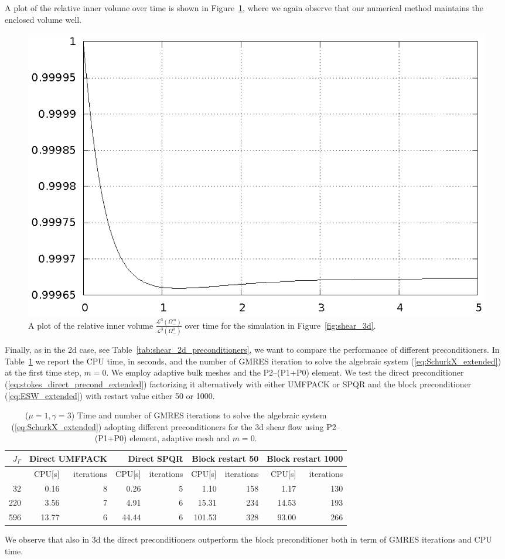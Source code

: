 A plot of the relative inner volume over time is shown in
Figure~\ref{fig:shear_3d_bulk_inner_volume}, where we again observe that our
numerical method maintains the enclosed volume well.
\begin{figure}[htbp]
\centering
\includegraphics[width=.45\textwidth]
{figures/stokes/3d_shear_bulk_inner_volume.ps}
\caption[Stokes 3d shear flow inner volume]
{A plot of the relative inner volume
$\frac{\mathcal{L}^3(\Omega^m_-)}{\mathcal{L}^3(\Omega^0_-)}$
over time for the simulation in Figure~\ref{fig:shear_3d}.}
\label{fig:shear_3d_bulk_inner_volume}
\end{figure}

Finally, as in the 2d case, see Table~\ref{tab:shear_2d_preconditioners}, we
want to compare the performance of different preconditioners. In
Table~\ref{tab:shear_3d_preconditioners} we report the CPU time, in seconds,
and the number of GMRES iteration to solve the algebraic system
(\ref{eq:SchurkX_extended}) at the first time step, $m=0$. We employ adaptive
bulk meshes and the P2--(P1+P0) element. We test the direct preconditioner
(\ref{eq:stokes_direct_precond_extended}) factorizing it alternatively with
either UMFPACK or SPQR and the block preconditioner (\ref{eq:ESW_extended})
with restart value either 50 or 1000.
\begin{table}
\center
\hspace*{-3.25cm}
\begin{tabular}{rrrrrrrrr}
\hline
$J_\Gamma$ & \multicolumn{2}{r}{Direct UMFPACK} &
\multicolumn{2}{r}{Direct SPQR} & \multicolumn{2}{r}{Block restart 50} &
\multicolumn{2}{r}{Block restart 1000} \\
\hline
 & CPU[s] & iterations & CPU[s] & iterations & CPU[s] & iterations & CPU[s] &
iterations \\
\hline
 32 &  0.16 & 8 &  0.26 & 5 &   1.10 & 158 &  1.17 & 130 \\
220 &  3.56 & 7 &  4.91 & 6 &  15.31 & 234 & 14.53 & 193 \\
596 & 13.77 & 6 & 44.44 & 6 & 101.53 & 328 & 93.00 & 266 \\
\hline
\end{tabular}
\hspace*{-3.25cm}
\caption[Stokes 3d shear flow preconditioners comparison]
{($\mu=1,\gamma=3$) Time and number of GMRES iterations to solve the algebraic
system (\ref{eq:SchurkX_extended}) adopting different preconditioners for the 3d
shear flow using P2--(P1+P0) element, adaptive mesh and $m=0$.}
\label{tab:shear_3d_preconditioners}
\end{table}
We observe that also in 3d the direct preconditioners outperform the block
preconditioner both in term of GMRES iterations and CPU time.